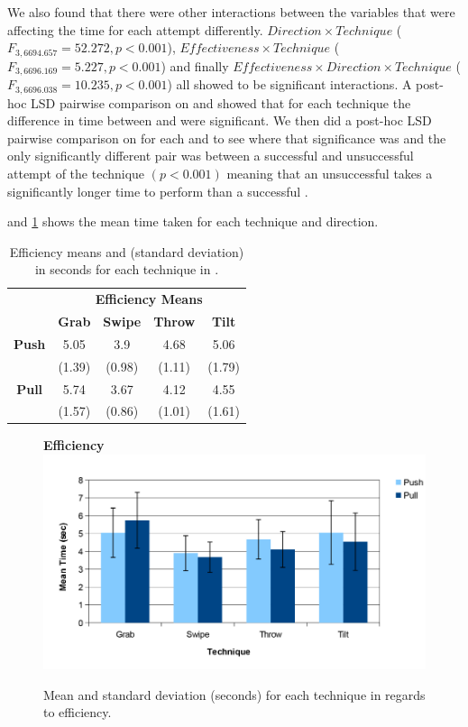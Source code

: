 We also found that there were other interactions between the variables that were affecting the time for each attempt differently. 
$Direction \times Technique$  ($F_{3,6694.657} = 52.272, p < 0.001$), $Effectiveness \times Technique$  ($F_{3,6696.169} = 5.227, p < 0.001$) and finally $Effectiveness \times Direction \times Technique$  ($F_{3,6696.038} = 10.235, p < 0.001$) all showed to be significant interactions. 
A post-hoc LSD pairwise comparison on \direction and \technique showed that for each technique the difference in time between \push and \pull were significant.
We then did a post-hoc LSD pairwise comparison on \effectiveness for each \technique and \direction to see where that significance was and the only significantly different pair was between a successful and unsuccessful attempt of the \grab \pull technique $(p < 0.001)$ meaning that an unsuccessful \grab \pull takes a significantly longer time to perform than a successful \grab \pull.

 and \cref{fig:efficiencyGraph} shows the mean time taken for each technique and direction.

\begin{table}[H]
	\centering
	\def\arraystretch{1}
		\begin{tabular}{c c c c c}
			& \multicolumn{4}{c}{\textbf{Efficiency Means}} \B \\
			\cline{2-5}
			& \textbf{Grab} & \textbf{Swipe} & \textbf{Throw} & \textbf{Tilt} \T\B \\ \hline
			\textbf{Push} & 5.05 & 3.9 & 4.68 & 5.06 \T \\ 
			& (1.39) & (0.98) & (1.11) & (1.79) \B \\ \hline
			\textbf{Pull} & 5.74 & 3.67 & 4.12 & 4.55 \T \\ 
			& (1.57) & (0.86) & (1.01) & (1.61) \B \\ \hline
		\end{tabular}
	\caption{Efficiency means and (standard deviation) in seconds for each technique in \target.}
	\label{tab:efficiency}
\end{table}

\begin{figure}[H]{
	\centering
	\textbf{Efficiency}\\[4pt]
	\includegraphics[width = 1\columnwidth ]{images/time_graph.pdf}} 
	\caption{
		Mean and standard deviation (seconds) for each technique in regards to efficiency.
	}
	\label{fig:efficiencyGraph}
\end{figure}

